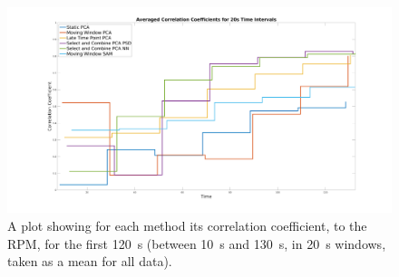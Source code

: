         
    
    \begin{figure}
        
        \centering
        
        \includegraphics[width=1.0\linewidth]{figures/all_correlation_coefficient.png}
        
        
        \captionsetup{singlelinecheck=false, justification=centering}
        \caption{
        A plot showing for each method its correlation coefficient, to the \gls{RPM}, for the first \SI{120}{\second} (between \SI{10}{\second} and \SI{130}{\second}, in \SI{20}{\second} windows, taken as a mean for all data).}
        
        \label{fig:all_cross_correlation}
        
    \end{figure}
    
